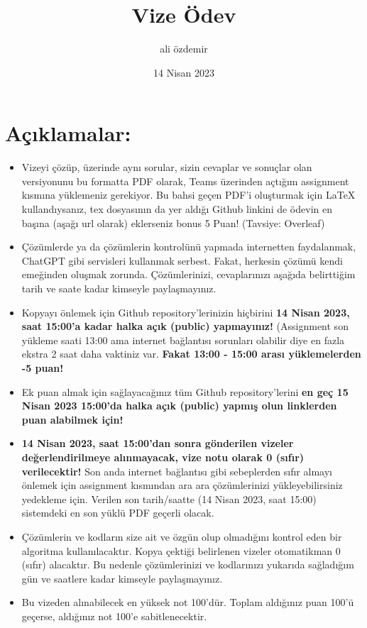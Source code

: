 \documentclass[11pt]{article}
\title{Vize Ödev}
\author{ali özdemir}
\date{14 Nisan 2023}
\begin{document}
\maketitle

\vspace{-.5in}
\section*{Açıklamalar:}
\begin{itemize}
    \item Vizeyi çözüp, üzerinde aynı sorular, sizin cevaplar ve sonuçlar olan versiyonunu bu formatta PDF olarak, Teams üzerinden açtığım assignment kısmına yüklemeniz gerekiyor. Bu bahsi geçen PDF'i oluşturmak için LaTeX kullandıysanız, tex dosyasının da yer aldığı Github linkini de ödevin en başına (aşağı url olarak) eklerseniz bonus 5 Puan! (Tavsiye: Overleaf)
    \item Çözümlerde ya da çözümlerin kontrolünü yapmada internetten faydalanmak, ChatGPT gibi servisleri kullanmak serbest. Fakat, herkesin çözümü kendi emeğinden oluşmak zorunda. Çözümlerinizi, cevaplarınızı aşağıda belirttiğim tarih ve saate kadar kimseyle paylaşmayınız. 
    \item Kopyayı önlemek için Github repository'lerinizin hiçbirini \textbf{14 Nisan 2023, saat 15:00'a kadar halka açık (public) yapmayınız!} (Assignment son yükleme saati 13:00 ama internet bağlantısı sorunları olabilir diye en fazla ekstra 2 saat daha vaktiniz var. \textbf{Fakat 13:00 - 15:00 arası yüklemelerden -5 puan!}
    \item Ek puan almak için sağlayacağınız tüm Github repository'lerini \textbf{en geç 15 Nisan 2023 15:00'da halka açık (public) yapmış olun linklerden puan alabilmek için!}
    \item \textbf{14 Nisan 2023, saat 15:00'dan sonra gönderilen vizeler değerlendirilmeye alınmayacak, vize notu olarak 0 (sıfır) verilecektir!} Son anda internet bağlantısı gibi sebeplerden sıfır almayı önlemek için assignment kısmından ara ara çözümlerinizi yükleyebilirsiniz yedekleme için. Verilen son tarih/saatte (14 Nisan 2023, saat 15:00) sistemdeki en son yüklü PDF geçerli olacak.
    \item Çözümlerin ve kodların size ait ve özgün olup olmadığını kontrol eden bir algoritma kullanılacaktır. Kopya çektiği belirlenen vizeler otomatikman 0 (sıfır) alacaktır. Bu nedenle çözümlerinizi ve kodlarınızı yukarıda sağladığım gün ve saatlere kadar kimseyle paylaşmayınız.
    \item Bu vizeden alınabilecek en yüksek not 100'dür. Toplam aldığınız puan 100'ü geçerse, aldığınız not 100'e sabitlenecektir.

\end{itemize}
\end{document}
